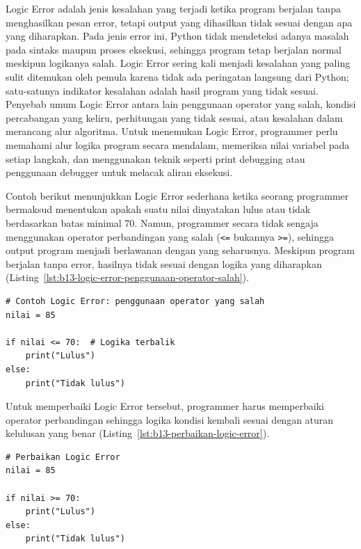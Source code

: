 Logic Error adalah jenis kesalahan yang terjadi ketika program berjalan tanpa menghasilkan pesan error, tetapi output yang dihasilkan tidak sesuai dengan apa yang diharapkan. Pada jenis error ini, Python tidak mendeteksi adanya masalah pada sintaks maupun proses eksekusi, sehingga program tetap berjalan normal meskipun logikanya salah. Logic Error sering kali menjadi kesalahan yang paling sulit ditemukan oleh pemula karena tidak ada peringatan langsung dari Python; satu-satunya indikator kesalahan adalah hasil program yang tidak sesuai. Penyebab umum Logic Error antara lain penggunaan operator yang salah, kondisi percabangan yang keliru, perhitungan yang tidak sesuai, atau kesalahan dalam merancang alur algoritma. Untuk menemukan Logic Error, programmer perlu memahami alur logika program secara mendalam, memeriksa nilai variabel pada setiap langkah, dan menggunakan teknik seperti print debugging atau penggunaan debugger untuk melacak aliran eksekusi.

Contoh berikut menunjukkan Logic Error sederhana ketika seorang programmer bermaksud menentukan apakah suatu nilai dinyatakan lulus atau tidak berdasarkan batas minimal 70. Namun, programmer secara tidak sengaja menggunakan operator perbandingan yang salah (\texttt{<=} bukannya \texttt{>=}), sehingga output program menjadi berlawanan dengan yang seharusnya. Meskipun program berjalan tanpa error, hasilnya tidak sesuai dengan logika yang diharapkan (Listing~\ref{lst:b13-logic-error-penggunaan-operator-salah}).

\begin{lstlisting}[style=PythonStyle, caption={Contoh Logic Error: penggunaan operator yang salah}, label={lst:b13-logic-error-penggunaan-operator-salah}]
# Contoh Logic Error: penggunaan operator yang salah
nilai = 85

if nilai <= 70:  # Logika terbalik
    print("Lulus")
else:
    print("Tidak lulus")
\end{lstlisting}

Untuk memperbaiki Logic Error tersebut, programmer harus memperbaiki operator perbandingan sehingga logika kondisi kembali sesuai dengan aturan kelulusan yang benar (Listing~\ref{lst:b13-perbaikan-logic-error}).

\begin{lstlisting}[style=PythonStyle, caption={Perbaikan Logic Error}, label={lst:b13-perbaikan-logic-error}]
# Perbaikan Logic Error
nilai = 85

if nilai >= 70:
    print("Lulus")
else:
    print("Tidak lulus")
\end{lstlisting}

